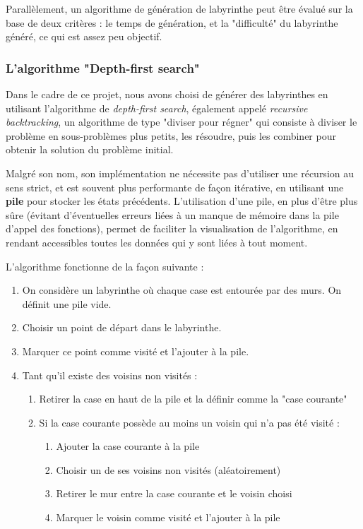 \documentclass[12pt]{scrreprt} %
\begin{document}
Parallèlement, un algorithme de génération de labyrinthe peut être évalué sur la base de deux critères : le temps de génération, et la "difficulté" du labyrinthe généré, ce qui est assez peu objectif.

\subsubsection{L'algorithme "Depth-first search"}

Dans le cadre de ce projet, nous avons choisi de générer des labyrinthes en utilisant l'algorithme de \textit{depth-first search}, également appelé \textit{recursive backtracking}, un algorithme de type "diviser pour régner" qui consiste à diviser le problème en sous-problèmes plus petits, les résoudre, puis les combiner pour obtenir la solution du problème initial.

Malgré son nom, son implémentation ne nécessite pas d'utiliser une récursion au sens strict, et est souvent plus performante de façon itérative, en utilisant une \textbf{pile} pour stocker les états précédents. L'utilisation d'une pile, en plus d'être plus sûre (évitant d'éventuelles erreurs liées à un manque de mémoire dans la pile d'appel des fonctions), permet de faciliter la visualisation de l'algorithme, en rendant accessibles toutes les données qui y sont liées à tout moment.

L'algorithme fonctionne de la façon suivante :

\begin{enumerate}
    \item On considère un labyrinthe où chaque case est entourée par des murs. On définit une pile vide.
    \item Choisir un point de départ dans le labyrinthe.
    \item Marquer ce point comme visité et l'ajouter à la pile.
    \item Tant qu'il existe des voisins non visités :
          \begin{enumerate}
              \item Retirer la case en haut de la pile et la définir comme la "case courante"
              \item Si la case courante possède au moins un voisin qui n'a pas été visité :
                    \begin{enumerate}
                        \item Ajouter la case courante à la pile
                        \item Choisir un de ses voisins non visités (aléatoirement)
                        \item Retirer le mur entre la case courante et le voisin choisi
                        \item Marquer le voisin comme visité et l'ajouter à la pile
                    \end{enumerate}
          \end{enumerate}
\end{enumerate}
\end{document}
